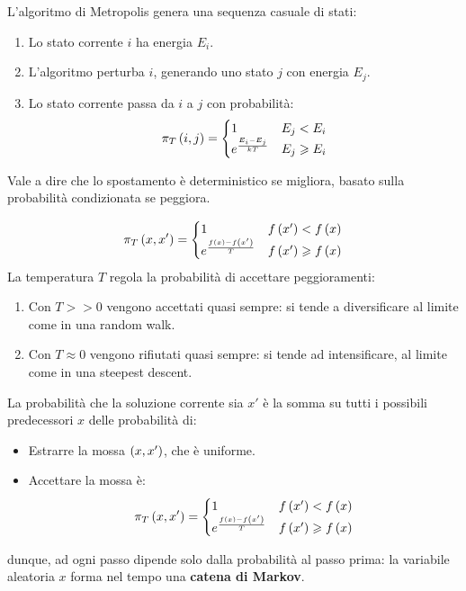 \documentclass[\main/main.tex]{subfiles}
\begin{document}
\begin{multicols}{2}
\begin{definition}
    L'algoritmo di Metropolis genera una sequenza casuale di stati:
    \begin{enumerate}
        \item Lo stato corrente \(i\) ha energia \(E_i\).
        \item L'algoritmo perturba \(i\), generando uno stato \(j\) con energia \(E_j\).
        \item Lo stato corrente passa da \(i\) a \(j\) con probabilità:
        \[
            \pi_{T}\left(i,j\right) = \begin{cases}
                1 & E_j < E_i\\
                e^{\frac{E_i - E_j}{kT}} & E_j \geqslant E_i
            \end{cases}
        \]
    \end{enumerate}
    Vale a dire che lo spostamento è deterministico se migliora, basato sulla probabilità condizionata se peggiora.
\end{definition}
\begin{definition}
\[
    \pi_T \left(x, x'\right) = \begin{cases}
        1 & f\left(x'\right) < f\left(x\right)\\
        e^{\frac{f\left(x\right) - f\left(x'\right)}{T}} & f\left(x'\right) \geqslant f\left(x\right) 
    \end{cases}
\]
La temperatura \(T\) regola la probabilità di accettare peggioramenti:
\begin{enumerate}
    \item Con \(T >> 0\) vengono accettati quasi sempre: si tende a diversificare al limite come in una random walk.
    \item Con \(T \approx 0\) vengono rifiutati quasi sempre: si tende ad intensificare, al limite come in una steepest descent.
\end{enumerate}
\end{definition}
\begin{analysis}
La probabilità che la soluzione corrente sia \(x'\) è la somma su tutti i possibili predecessori \(x\) delle probabilità di:
\begin{itemize}
    \item Estrarre la mossa \(\left(x, x'\right)\), che è uniforme.
    \item Accettare la mossa è:
    \[
        \pi_T \left(x, x'\right) = \begin{cases}
            1 & f\left(x'\right) < f\left(x\right)\\
            e^{\frac{f\left(x\right) - f\left(x'\right)}{T}} & f\left(x'\right) \geqslant f\left(x\right) 
        \end{cases}
    \]
\end{itemize}
dunque, ad ogni passo dipende solo dalla probabilità al passo prima: la variabile aleatoria \(x\) forma nel tempo una \textbf{catena di Markov}.


\end{analysis}
\end{multicols}
\end{document}
